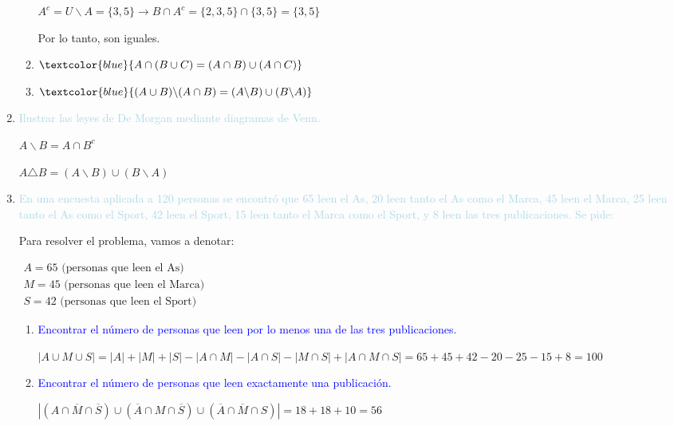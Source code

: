 \documentclass{article}
\newcommand{\lb}[1]{\textcolor{lightblue}{#1}}
\newcommand{\db}[1]{\textcolor{blue}{#1}}
\begin{document}
\begin{enumerate}[label=\color{red}\textbf{\arabic*)},leftmargin=*]
\begin{enumerate}[label=\color{red}\alph*)]
      	$A^c=U\backslash A=\{3,5\}\longrightarrow B\cap A^c=\{2,3,5\}\cap\{3,5\}=\{3,5\}$
      	
      	Por lo tanto, son iguales.
      	\item $\db{A\cap(B\cup C)=(A\cap B)\cup(A\cap C)}$
      	\item $\db{(A\cup B)\backslash(A\cap B)=(A\backslash B)\cup(B\backslash A)}$
      \end{enumerate}
      \item \lb{Ilustrar las leyes de De Morgan mediante diagramas de Venn.}
      
      $A\backslash B=A\cap B^c$
      
      \begin{venndiagram2sets}[shade=lightblue!20]
      	\fillANotB
      \end{venndiagram2sets}
      
      $A\triangle B=(A\backslash B)\cup(B\backslash A)$
      
      \begin{venndiagram2sets}[shade=lightblue!20]
      	\fillANotB
      	\fillBNotA
      \end{venndiagram2sets}
      \item \lb{En una encuesta aplicada a 120 personas se encontró que 65 leen el As, 20 leen tanto el As como el Marca, 45 leen el Marca, 25 leen tanto el As como el Sport, 42 leen el Sport, 15 leen tanto el Marca como el Sport, y 8 leen las tres publicaciones. Se pide:}
      
      Para resolver el problema, vamos a denotar: 
      
      $\begin{array}{l}
      	A = 65 \text{ (personas que leen el As)}\\
      	M = 45 \text{ (personas que leen el Marca)}\\
      	S = 42 \text{ (personas que leen el Sport)}
      \end{array}$
      \begin{enumerate}[label=\color{red}\alph*)]
      	\item \db{Encontrar el número de personas que leen por lo menos una de las tres publicaciones.}

      	$|A\cup M\cup S|=|A|+|M|+|S|-|A\cap M|-|A\cap S|-|M\cap S|+|A\cap M\cap S|=65+45+42-20-25-15+8=100$
      	\item \db{Encontrar el número de personas que leen exactamente una publicación.}
      	
      	$\left|\left(A\cap\overline{M}\cap\overline{S}\right)\cup\left(\overline{A}\cap M\cap \overline{S}\right)\cup\left(\overline{A}\cap \overline{M}\cap S\right)\right|=18+18+10=56$
      	

\end{enumerate}
\end{enumerate}
\end{document}
